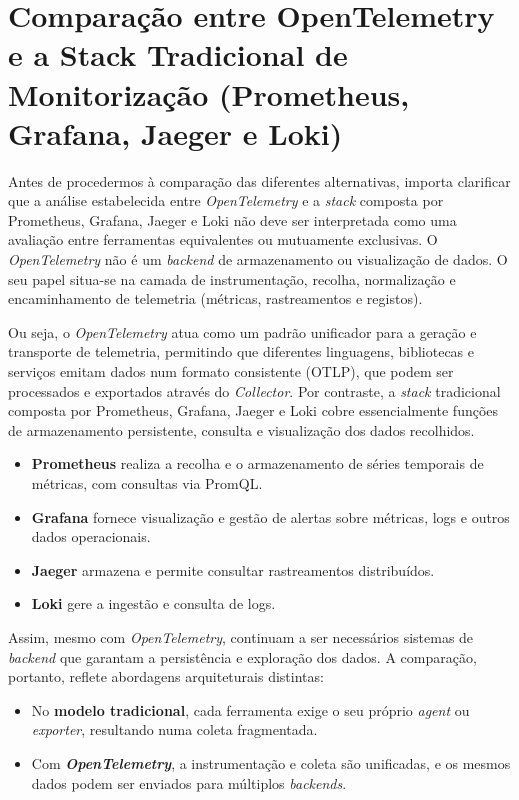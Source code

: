 \break


\section{Comparação entre OpenTelemetry e a Stack Tradicional de Monitorização (Prometheus, Grafana, Jaeger e Loki)}


Antes de procedermos à comparação das diferentes alternativas, importa clarificar que a análise estabelecida entre \textit{OpenTelemetry} e a \textit{stack} composta por Prometheus, Grafana, Jaeger e Loki não deve ser interpretada como uma avaliação entre ferramentas equivalentes ou mutuamente exclusivas. O \textit{OpenTelemetry} não é um \textit{backend} de armazenamento ou visualização de dados. O seu papel situa-se na camada de instrumentação, recolha, normalização e encaminhamento de telemetria (métricas, rastreamentos e registos).

Ou seja, o \textit{OpenTelemetry} atua como um padrão unificador para a geração e transporte de telemetria, permitindo que diferentes linguagens, bibliotecas e serviços emitam dados num formato consistente (OTLP), que podem ser processados e exportados através do \textit{Collector}. Por contraste, a \textit{stack} tradicional composta por Prometheus, Grafana, Jaeger e Loki cobre essencialmente funções de armazenamento persistente, consulta e visualização dos dados recolhidos.

\begin{itemize}
\item \textbf{Prometheus} realiza a recolha e o armazenamento de séries temporais de métricas, com consultas via PromQL.
\item \textbf{Grafana} fornece visualização e gestão de alertas sobre métricas, logs e outros dados operacionais.
\item \textbf{Jaeger} armazena e permite consultar rastreamentos distribuídos.
\item \textbf{Loki} gere a ingestão e consulta de logs.
\end{itemize}

Assim, mesmo com \textit{OpenTelemetry}, continuam a ser necessários sistemas de \textit{backend} que garantam a persistência e exploração dos dados. A comparação, portanto, reflete abordagens arquiteturais distintas:

\begin{itemize}
\item No \textbf{modelo tradicional}, cada ferramenta exige o seu próprio \textit{agent} ou \textit{exporter}, resultando numa coleta fragmentada.
\item Com \textbf{\textit{OpenTelemetry}}, a instrumentação e coleta são unificadas, e os mesmos dados podem ser enviados para múltiplos \textit{backends}.
\end{itemize}

